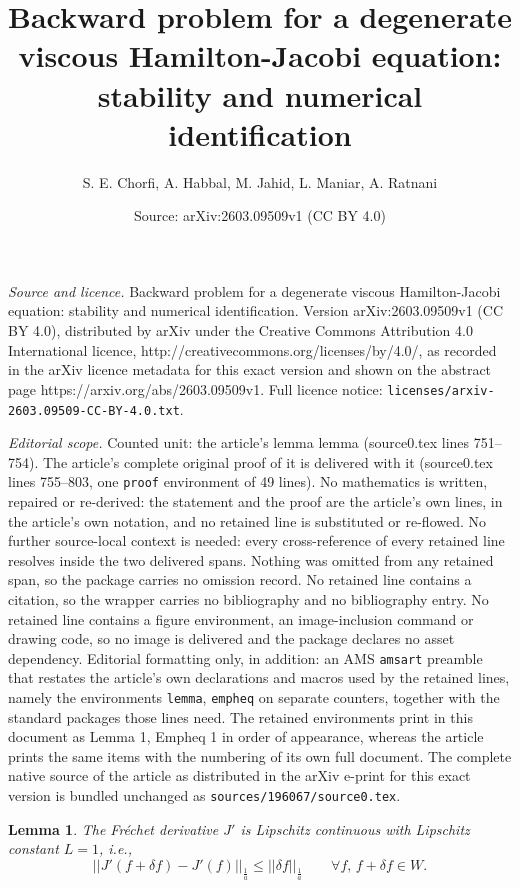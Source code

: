 \documentclass[10pt,a4paper]{amsart}
\title{Backward problem for a degenerate viscous Hamilton-Jacobi equation: stability and numerical identification}
\author{S. E. Chorfi, A. Habbal, M. Jahid, L. Maniar, A. Ratnani}
\date{Source: arXiv:2603.09509v1 (CC BY 4.0)}
\newtheorem{lemma}{Lemma}
\begin{document}
\maketitle

\noindent\emph{Source and licence.} Backward problem for a degenerate viscous Hamilton-Jacobi equation: stability and numerical identification. Version arXiv:2603.09509v1 (CC BY 4.0), distributed by arXiv under the Creative Commons Attribution 4.0 International licence, http://creativecommons.org/licenses/by/4.0/, as recorded in the arXiv licence metadata for this exact version and shown on the abstract page https://arxiv.org/abs/2603.09509v1. Full licence notice: \texttt{licenses/arxiv-2603.09509-CC-BY-4.0.txt}.\par\smallskip

\noindent\textit{Editorial scope.} Counted unit: the article's lemma lemma (source0.tex lines 751--754). The article's complete original proof of it is delivered with it (source0.tex lines 755--803, one \texttt{proof} environment of 49 lines). No mathematics is written, repaired or re-derived: the statement and the proof are the article's own lines, in the article's own notation, and no retained line is substituted or re-flowed.  No further source-local context is needed: every cross-reference of every retained line resolves inside the two delivered spans.  Nothing was omitted from any retained span, so the package carries no omission record.  No retained line contains a citation, so the wrapper carries no bibliography and no bibliography entry.  No retained line contains a figure environment, an image-inclusion command or drawing code, so no image is delivered and the package declares no asset dependency.  Editorial formatting only, in addition: an AMS \texttt{amsart} preamble that restates the article's own declarations and macros used by the retained lines, namely the environments \texttt{lemma}, \texttt{empheq} on separate counters, together with the standard packages those lines need.  The retained environments print in this document as Lemma 1, Empheq 1 in order of appearance, whereas the article prints the same items with the numbering of its own full document.  The complete native source of the article as distributed in the arXiv e-print for this exact version is bundled unchanged as \texttt{sources/196067/source0.tex}.
\begin{lemma}
The Fréchet derivative $J'$ is Lipschitz continuous with Lipschitz constant $L=1$, i.e.,
    $$ \vert \vert J'(f + \delta f )-J'(f)\vert\vert_{\frac{1}{a}}\leqslant  \vert \vert \delta f\vert \vert_{\frac{1}{a}} \qquad \forall f,\, f+\delta f \in W.$$
\end{lemma}
\end{document}
